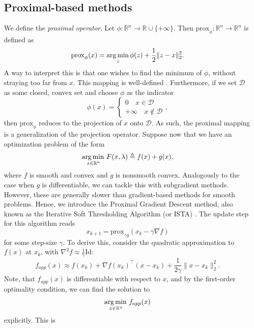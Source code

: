 \documentclass[11pt, twoside]{report}
\begin{document}
\subsection{Proximal-based methods}
We define the \textit{proximal operator}. Let $\phi : \mathbb{R}^n \xrightarrow[]{} \mathbb{R} \cup \{+
\infty\}$. Then $\mathrm{prox}_\phi: \mathbb{R}^n \xrightarrow[]{} \mathbb{R}^n$ is defined as
\begin{equation} \label{proximal}
    \mathrm{prox}_{\phi}(x) =\underset{z} {\operatorname*{arg\, min \,}} \phi(z) + \frac{1}{2}\|z-x\|_2^2.
\end{equation}
A way to interpret this is that one wishes to find the minimum of $\phi$, without straying too far from $x$\cite{proxalgs}. This mapping is well-defined \cite{fawzi2022lectures}. Furthermore, if we set $\mathcal{D}$ as some closed, convex set and choose $\phi$ as the indicator
\[\phi(x) = \begin{cases}
  0 \quad x \in \mathcal{D} \\
  +\infty \quad x \notin \mathcal{D}
\end{cases},\]
then $\mathrm{prox}_\phi$ reduces to the projection of $x$ onto $\mathcal{D}$. As such, the proximal mapping is a generalization of the projection operator. Suppose now that we have an optimization problem of the form
\begin{equation}
    \operatorname*{arg\, min \,}_{x \in \mathbb{R}^n} {F(x, \lambda) \triangleq f(x) + g(x)},
\end{equation}
where $f$ is smooth and convex and $g$ is nonsmooth convex. Analogously to the case when $g$ is differentiable, we can tackle this with subgradient methods. However, these are generally slower than gradient-based methods for smooth problems. Hence, we introduce the Proximal Gradient Descent method, also known as the Iterative Soft Thresholding Algorithm (or ISTA) \cite{daubechies2004iterative}. The update step for this algorithm reads
\begin{equation} \label{ISTA_step}
    x_{k+1} = \mathrm{prox}_{\gamma g}(x_k - \gamma \nabla f)
\end{equation}
for some step-size $\gamma$. To derive this, consider the quadratic approximation to $f(x)$ at $x_k$, with $\nabla^2 f \approx \frac{1}{\gamma}\mathrm{Id}$:
\[f_{app}(x) \approx f(x_k) + \nabla f(x_k)^\top (x-x_k) + \frac{1}{2\gamma} \|x-x_k\|_2^2.\]
Note, that $f_{app}(x)$ is differentiable with respect to $x$, and by the first-order optimality condition, we can find the solution to 
\[\operatorname*{arg\, min \,}_{x \in \mathbb{R}^n} f_{app}(x)\]
explicitly. This is
\end{document}
